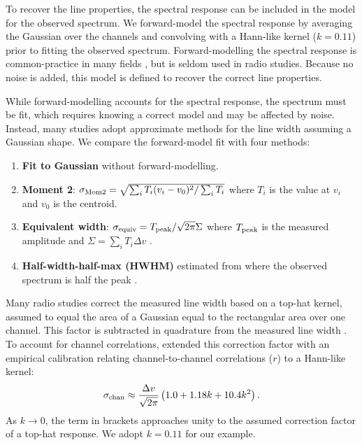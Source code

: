 \documentclass{rnaastex}
\begin{document}

To recover the line properties, the spectral response can be included in the model for the observed spectrum.  We forward-model the spectral response by averaging the Gaussian over the channels and convolving with a Hann-like kernel ($k=0.11$) prior to fitting the observed spectrum.  Forward-modelling the spectral response is common-practice in many fields \citep[e.g.,][]{martin2015}, but is seldom used in radio studies.  Because no noise is added, this model is defined to recover the correct line properties.

While forward-modelling accounts for the spectral response, the spectrum must be fit, which requires knowing a correct model and may be affected by noise.  Instead, many studies adopt approximate methods for the line width assuming a Gaussian shape. We compare the forward-model fit with four methods:
\begin{enumerate}
    \item {\bf Fit to Gaussian} without forward-modelling.
    \item {\bf Moment 2}: $\sigma_{\rm Mom2}=\sqrt{\sum_i T_i (v_i - v_0)^2 / \sum_i T_i}$ where $T_i$ is the value at $v_i$ and $v_0$ is the centroid.
    \item {\bf Equivalent width}: $\sigma_{\rm equiv} = T_{\rm peak} / \sqrt{2\pi} \Sigma$ where $T_{\rm peak}$ is the measured amplitude and $\Sigma= \sum_i T_i \Delta v$ \citep{heyer2001,leroy2016,sun2018}.
    \item {\bf Half-width-half-max (HWHM)} estimated from where the observed spectrum is half the peak \citep{stilp2013a,stilp2013b,koch2018}.
\end{enumerate}

Many radio studies correct the measured line width based on a top-hat kernel, assumed to equal the area of a Gaussian equal to the rectangular area over one channel. This factor is subtracted in quadrature from the measured line width \citep{cprops}.  To account for channel correlations, \citet{leroy2016} extended this correction factor with an empirical calibration relating channel-to-channel correlations ($r$) to a Hann-like kernel:
\begin{equation}
    \label{eq:leroy16_corrfact}
    \sigma_{\rm chan} \approx \frac{\Delta v}{\sqrt{2\pi}} \left( 1.0 + 1.18k + 10.4 k^2 \right).
\end{equation}
As $k\rightarrow0$, the term in brackets approaches unity to the assumed correction factor of a top-hat response.  We adopt $k=0.11$ for our example\citep[see][]{sun2018}.
\end{document}

